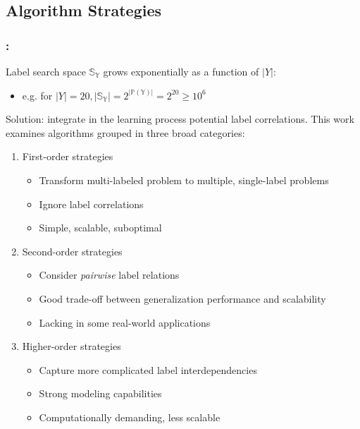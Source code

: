 \documentclass{beamer}
\begin{document}
\subsection{Algorithm Strategies}
\begin{frame}
\frametitle{\insertsection : \insertsubsection}
Label search space $\mathbb{S_Y}$ grows exponentially as a function of $|Y|$: 
\begin{itemize}
	\item e.g. for $|Y|=20, |\mathbb{S_Y}| = 2 ^ {|\mathbb{P(Y)}|} = 2^{20} \ge 10^6$
\end{itemize}
Solution: integrate in the learning process potential label correlations.
This work examines algorithms grouped in three broad categories:

\begin{enumerate}
	\item First-order strategies
		\begin{itemize}
			\item Transform multi-labeled problem to multiple, single-label problems 
			\item Ignore label correlations 
			\item Simple, scalable, suboptimal
		\end{itemize}
	\item Second-order strategies
		\begin{itemize}
			\item Consider \emph{pairwise} label relations
			\item Good trade-off between generalization performance and scalability
			\item Lacking in some real-world applications
		\end{itemize} 
	\item Higher-order strategies
		\begin{itemize}
			\item Capture more complicated label interdependencies
			\item Strong modeling capabilities
			\item Computationally demanding, less scalable
		\end{itemize}

\end{enumerate}
\end{frame}

\end{document}
